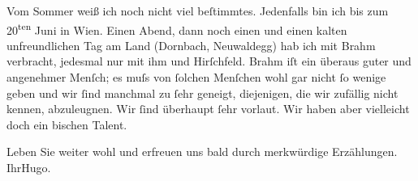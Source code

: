 \pstart
           Vom Sommer weiß ich noch nicht viel beſtimmtes. Jedenfalls bin ich bis zum
                     20\textsuperscript{ten} Juni in Wien. Einen Abend, dann noch einen und einen kalten
               unfreundlichen Tag am Land (Dornbach, Neuwaldegg) hab ich mit Brahm verbracht, jedesmal {\pb}nur mit ihm und Hirſchfeld. Brahm iſt ein überaus guter und angenehmer Menſch; es muſs von{ }ſolchen
               Menſchen wohl gar nicht{ }ſo wenige geben und wir{ }ſind manchmal zu{ }ſehr geneigt,
               diejenigen, die wir zufällig nicht kennen, abzuleugnen. Wir{ }ſind überhaupt{ }ſehr
               vorlaut. Wir haben aber vielleicht doch ein bischen Talent.\pend
           
\pstart
           Leben Sie weiter wohl und erfreuen uns bald durch merkwürdige Erzählungen.\pend
           \pstart Ihr\spacefill\mbox{Hugo.}\pend{}\endnumbering{}  \newcommand{\dateiname}{L00677}\newcommand{\titel}{Hugo von Hofmannsthal an Arthur Schnitzler, 17. 5. [1897]}\newcommand{\editorInnen}{Martin Anton Müller und Gerd-Hermann Susen}
